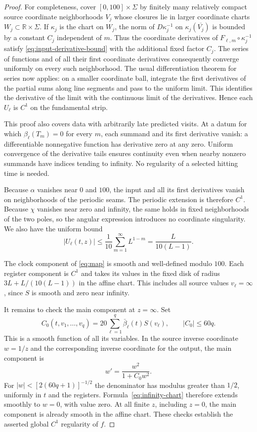 \begin{proof}
For completeness, cover $[0,100]\times\Sigma$ by finitely many relatively
compact source coordinate neighborhoods $V_j$ whose closures lie in larger coordinate
charts $W_j\subset\mathbb R\times\Sigma$.  If $\kappa_j$ is the chart
on $W_j$, the norm of $D\kappa_j^{-1}$ on
$\kappa_j(\overline{V_j})$ is bounded by a constant $C_j$ independent of
$m$.  Thus the coordinate derivatives of
$F_{\ell,m}\circ\kappa_j^{-1}$ satisfy \eqref{eq:input-derivative-bound}
with the additional fixed factor $C_j$.  The series of functions and
of all their first coordinate derivatives consequently converge
uniformly on every such neighborhood.  The usual differentiation
theorem for series now applies: on a smaller coordinate ball, integrate
the first derivatives of the partial sums along line segments and pass
to the uniform limit.  This identifies the derivative of the limit
with the continuous limit of the derivatives.  Hence each $U_\ell$ is
$C^1$ on the fundamental strip.

This proof also covers data with arbitrarily late predicted visits.
At a datum for which $\beta_\ell(T_m)=0$ for every $m$, each summand and
its first derivative vanish: a differentiable nonnegative function has
derivative zero at any zero.  Uniform convergence of the derivative
tails ensures continuity even when nearby nonzero summands have indices
tending to infinity.  No regularity of a selected hitting time is needed.

Because $\alpha$ vanishes near $0$ and $100$, the input and all its
first derivatives vanish on neighborhoods of the periodic seams.
The periodic extension is therefore $C^1$.  Because $\chi$ vanishes
near zero and infinity, the same holds in fixed neighborhoods of the
two poles, so the angular expression introduces no coordinate
singularity.  We also have the uniform bound
\begin{equation}
\label{eq:input-size}
 |U_\ell(t,z)|\le\frac1{10}\sum_{m=1}^{\infty}L^{1-m}
             =\frac{L}{10(L-1)}.
\end{equation}

The clock component of \eqref{eq:map} is smooth and well-defined modulo
$100$.  Each register component is $C^1$ and takes its values in the
fixed disk of radius $3L+L/(10(L-1))$ in the affine chart.  This includes
all source values $v_\ell=\infty$, since $S$ is smooth and zero near
infinity.

It remains to check the main component at $z=\infty$.  Set
\[
 C_0(t,v_1,\ldots,v_q)=20\sum_{\ell=1}^q\bar\beta_\ell(t)S(v_\ell),
 \qquad |C_0|\le60q.
\]
This is a smooth function of all its variables.  In the source inverse
coordinate $w=1/z$ and the corresponding inverse coordinate for the
output, the main component is
\begin{equation}
\label{eq:infinity-chart}
 w'=\frac{w^2}{1+C_0w^2}.
\end{equation}
For $|w|<[2(60q+1)]^{-1/2}$ the denominator has modulus greater than
$1/2$, uniformly in $t$ and the registers.  Formula~\eqref{eq:infinity-chart}
therefore extends smoothly to $w=0$, with value zero.  At all finite
$z$, including $z=0$, the main component is already smooth in the
affine chart.  These checks establish the asserted global $C^1$
regularity of $f$.
\end{proof}
